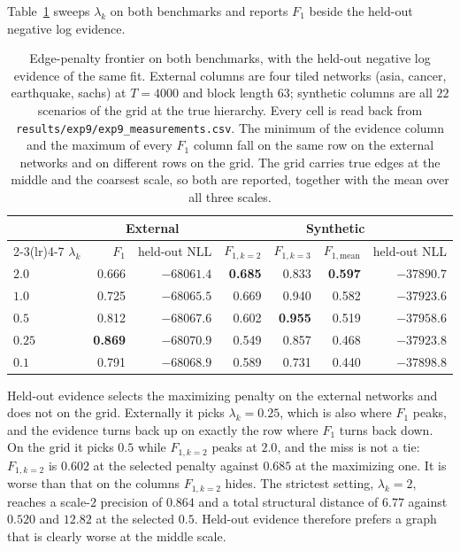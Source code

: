 Table~\ref{tab:results:frontier} sweeps $\lambda_k$ on both benchmarks and
reports $F_1$ beside the held-out negative log evidence.

\begin{table}[t]
\centering
\caption{Edge-penalty frontier on both benchmarks, with the held-out negative
log evidence of the same fit. External columns are four tiled networks (asia,
cancer, earthquake, sachs) at $T = 4000$ and block length $63$; synthetic
columns are all $22$ scenarios of the grid at the true hierarchy. Every cell
is read back from \texttt{results/exp9/exp9\_measurements.csv}. The minimum of
the evidence column and the maximum of every $F_1$ column fall on the same row
on the external networks and on different rows on the grid. The grid carries
true edges at the middle and the coarsest scale, so both are reported, together
with the mean over all three scales.}
\label{tab:results:frontier}
\small
\begin{tabular}{lrrrrrr}
\toprule
& \multicolumn{2}{c}{External} & \multicolumn{4}{c}{Synthetic} \\
\cmidrule(lr){2-3}\cmidrule(lr){4-7}
$\lambda_k$ & $F_1$ & held-out NLL & $F_{1,k=2}$ & $F_{1,k=3}$ & $F_{1,\mathrm{mean}}$ & held-out NLL \\
\midrule
$2.0$  & 0.666 & $-68061.4$ & \textbf{0.685} & 0.833 & \textbf{0.597} & $-37890.7$ \\
$1.0$  & 0.725 & $-68065.5$ & 0.669 & 0.940 & 0.582 & $-37923.6$ \\
$0.5$  & 0.812 & $-68067.6$ & 0.602 & \textbf{0.955} & 0.519 & $\mathbf{-37958.6}$ \\
$0.25$ & \textbf{0.869} & $\mathbf{-68070.9}$ & 0.549 & 0.857 & 0.468 & $-37923.8$ \\
$0.1$  & 0.791 & $-68068.9$ & 0.589 & 0.731 & 0.440 & $-37898.8$ \\
\bottomrule
\end{tabular}
\end{table}

Held-out evidence selects the maximizing penalty on the external networks and
does not on the grid. Externally it picks $\lambda_k = 0.25$, which is also
where $F_1$ peaks, and the evidence turns back up on exactly the row where
$F_1$ turns back down. On the grid it picks $0.5$ while $F_{1,k=2}$ peaks at
$2.0$, and the miss is not a tie: $F_{1,k=2}$ is $0.602$ at the selected
penalty against $0.685$ at the maximizing one. It is worse than that on the
columns $F_{1,k=2}$ hides. The strictest setting, $\lambda_k = 2$, reaches a
scale-$2$ precision of $0.864$ and a total structural distance of $6.77$ against
$0.520$ and $12.82$ at the selected $0.5$. Held-out evidence therefore prefers a
graph that is clearly worse at the middle scale.

